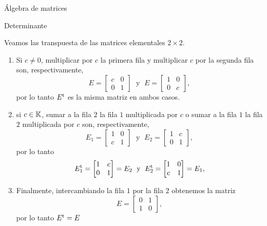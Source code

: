 \begin{chapter}{\'Algebra de matrices}
\begin{section}{Determinante}
    \begin{ejemplo*} Veamos las transpuesta de las matrices elementales  $2 \times 2$.
        \begin{enumerate}
            \item Si $c \not=0$, multiplicar por  $c$ la primera fila y multiplicar $c$ por la segunda fila son, respectivamente,
            \begin{equation*}
            E = \begin{bmatrix} c& 0\\ 0&1\end{bmatrix}\;\text{ y }\; E = \begin{bmatrix} 1& 0\\ 0&c\end{bmatrix},
            \end{equation*}
            por lo tanto $E^{\operatorname{t}}$ es la misma matriz en ambos casos. 
            \item si  $c \in \mathbb K$, sumar a la fila $2$ la fila $1$ multiplicada por $c$ o sumar a la fila $1$ la fila $2$ multiplicada por $c$ son, respectivamente,
            \begin{equation*}
            E_1 = \begin{bmatrix} 1& 0\\ c&1\end{bmatrix}\;\text{ y }\; E_2 = \begin{bmatrix} 1& c\\ 0&1\end{bmatrix},
            \end{equation*}
            por lo tanto 
            \begin{equation*}
            E_1^{\operatorname{t}} = \begin{bmatrix} 1& c\\ 0&1\end{bmatrix} = E_2 \;\text{ y }\; E_2^{\operatorname{t}} = \begin{bmatrix} 1& 0\\ c&1\end{bmatrix} =E_1,
            \end{equation*}
            \item Finalmente, intercambiando la fila $1$ por la fila $2$ obtenemos la matriz
            \begin{equation*}
            E = \begin{bmatrix} 0& 1\\ 1&0\end{bmatrix},
            \end{equation*}
            por lo tanto $E^{\operatorname{t}} =E$
        \end{enumerate}
    \end{ejemplo*}
    


\end{section}
\end{chapter}
